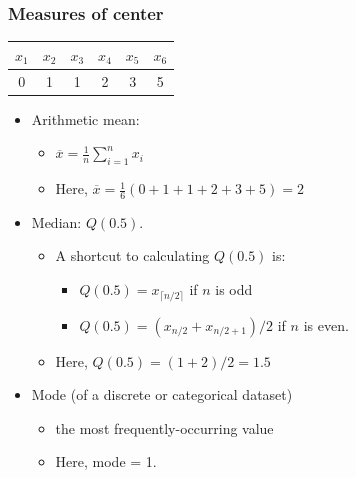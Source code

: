 \documentclass{beamer}\usepackage{graphicx, color}
\providecommand{\ov}[1]{\overline{#1}}
\numberwithin{equation}{section}
\begin{document}
\begin{frame}
\frametitle{Measures of center}

\begin{center}
\begin{tabular}{cccccc}
$x_1$ & $x_2$ & $x_3$& $x_4$ & $x_5$ & $x_6$  \\ \hline
0 & 1 & 1 & 2 & 3 & 5
\end{tabular}
\end{center}

\begin{itemize}
\pause \item Arithmetic mean:
\begin{itemize}
\pause \item $\ov{x} = \frac{1}{n} \sum_{i = 1}^n x_i$
\pause \item Here, $\ov{x} = \frac{1}{6} (0+1+1+2+3+5) = 2$
\end{itemize}
\pause \item Median: $Q(0.5)$. 
\begin{itemize}
\pause \item A shortcut to calculating $Q(0.5)$ is:
\begin{itemize}
\pause \item $Q(0.5) = x_{\lceil n/2 \rceil}$ if $n$ is odd
\pause \item $Q(0.5) = (x_{n/2} + x_{n/2 + 1}) / 2$ if $n$ is even.
\end{itemize}
\pause \item Here, $Q(0.5) = (1 + 2)/2 = 1.5$
\end{itemize}
\pause \item Mode (of a discrete or categorical dataset)
\begin{itemize}
\pause \item the most frequently-occurring value
\pause \item Here, mode = 1.
\end{itemize}
\end{itemize}
\end{frame}
\end{document}
